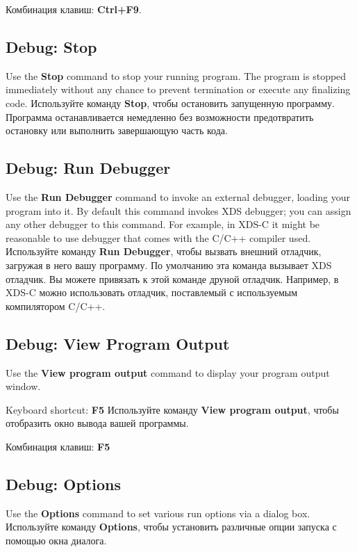 Комбинация клавиш: {\bf Ctrl+F9}.
\fi
\subsection{Debug: Stop}

\ifenglish
Use the {\bf Stop} command to stop your running program. The program is stopped
immediately without any chance to prevent termination or execute any finalizing
code.
\else
Используйте команду {\bf Stop}, чтобы остановить запущенную программу. Программа
останавливается немедленно без возможности предотвратить остановку или выполнить
завершающую часть кода.
\fi
\subsection{Debug: Run Debugger}

\ifenglish
Use the {\bf Run Debugger} command to invoke an external debugger,
loading your program into it. By default this command invokes XDS debugger;
you can assign any other debugger to this command. For example, in XDS-C
it might be reasonable to use debugger that comes with the C/C++ compiler used.
\else
Используйте команду {\bf Run Debugger}, чтобы вызвать внешний отладчик, загружая
в него вашу программу. По умолчанию эта команда вызывает XDS отладчик. 
Вы можете привязать к этой команде друной отладчик. Например, в XDS-C можно
использовать отладчик, поставлемый с используемым компилятором C/C++.
\fi
\subsection{Debug: View Program Output}

\ifenglish
Use the {\bf View program output} command to display
your program output window.

Keyboard shortcut: {\bf F5}
\else
Используйте команду {\bf View program output}, чтобы отобразить окно вывода 
вашей программы.

Комбинация клавиш: {\bf F5}
\fi
\subsection{Debug: Options}

\ifenglish
Use the {\bf Options} command to set various run options
via a dialog box.
\else
Используйте команду {\bf Options}, чтобы установить различные опции запуска
с помощью окна диалога.
\fi